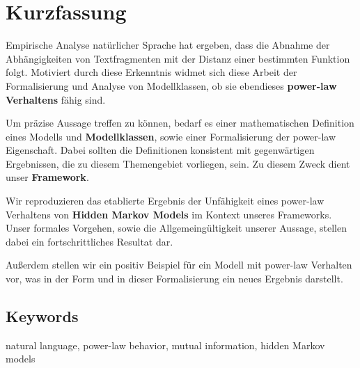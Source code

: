 \documentclass[../../main.tex]{subfiles}
\begin{document}
\section*{Kurzfassung}
Empirische Analyse natürlicher Sprache hat ergeben, dass die Abnahme der Abhängigkeiten von Textfragmenten mit der Distanz einer bestimmten Funktion folgt. Motiviert durch diese Erkenntnis widmet sich diese Arbeit der Formalisierung und Analyse von Modellklassen, ob sie ebendieses \textbf{power-law Verhaltens} fähig sind.

Um präzise Aussage treffen zu können, bedarf es einer mathematischen Definition eines Modells und \textbf{Modellklassen}, sowie einer Formalisierung der power-law Eigenschaft. Dabei sollten die Definitionen konsistent mit gegenwärtigen Ergebnissen, die zu diesem Themengebiet vorliegen, sein. Zu diesem Zweck dient unser \textbf{Framework}.

Wir reproduzieren das etablierte Ergebnis der Unfähigkeit eines power-law Verhaltens von \textbf{Hidden Markov Models} im Kontext unseres Frameworks. Unser formales Vorgehen, sowie die Allgemeingültigkeit unserer Aussage, stellen dabei ein fortschrittliches Resultat dar.

Außerdem stellen wir ein positiv Beispiel für ein Modell mit power-law Verhalten vor, was in der Form und in dieser Formalisierung ein neues Ergebnis darstellt.

\bigskip
\subsection*{Keywords}
natural language, power-law behavior, mutual information, hidden Markov models
\end{document}
